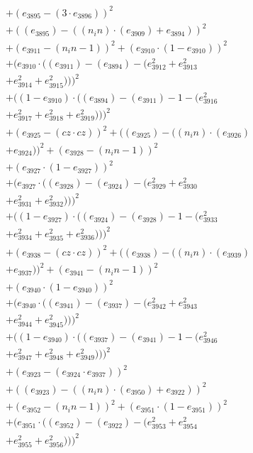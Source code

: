 \documentclass[10pt, a4paper]{article}
\begin{document}
\begin{small}
\begin{align*}
& + (e_{3895} - (3  \cdot  e_{3896}))^{2} \\
& + ((e_{3895}) - ((n_in)  \cdot  (e_{3909}) + e_{3894}))^{2} \\
& + (e_{3911} - (n_in - 1))^{2} + (e_{3910}  \cdot  (1 - e_{3910}))^{2} \\
& + (e_{3910}  \cdot  ((e_{3911}) - (e_{3894}) - (e_{3912}^{2} + e_{3913}^{2} \\
& + e_{3914}^{2} + e_{3915}^{2})))^{2} \\
& + ((1 - e_{3910})  \cdot  ((e_{3894}) - (e_{3911}) - 1 - (e_{3916}^{2} \\
& + e_{3917}^{2} + e_{3918}^{2} + e_{3919}^{2})))^{2} \\
& + (e_{3925} - (cz  \cdot  cz))^{2} + ((e_{3925}) - ((n_in)  \cdot  (e_{3926}) \\
& + e_{3924}))^{2} + (e_{3928} - (n_in - 1))^{2} \\
& + (e_{3927}  \cdot  (1 - e_{3927}))^{2} \\
& + (e_{3927}  \cdot  ((e_{3928}) - (e_{3924}) - (e_{3929}^{2} + e_{3930}^{2} \\
& + e_{3931}^{2} + e_{3932}^{2})))^{2} \\
& + ((1 - e_{3927})  \cdot  ((e_{3924}) - (e_{3928}) - 1 - (e_{3933}^{2} \\
& + e_{3934}^{2} + e_{3935}^{2} + e_{3936}^{2})))^{2} \\
& + (e_{3938} - (cz  \cdot  cz))^{2} + ((e_{3938}) - ((n_in)  \cdot  (e_{3939}) \\
& + e_{3937}))^{2} + (e_{3941} - (n_in - 1))^{2} \\
& + (e_{3940}  \cdot  (1 - e_{3940}))^{2} \\
& + (e_{3940}  \cdot  ((e_{3941}) - (e_{3937}) - (e_{3942}^{2} + e_{3943}^{2} \\
& + e_{3944}^{2} + e_{3945}^{2})))^{2} \\
& + ((1 - e_{3940})  \cdot  ((e_{3937}) - (e_{3941}) - 1 - (e_{3946}^{2} \\
& + e_{3947}^{2} + e_{3948}^{2} + e_{3949}^{2})))^{2} \\
& + (e_{3923} - (e_{3924}  \cdot  e_{3937}))^{2} \\
& + ((e_{3923}) - ((n_in)  \cdot  (e_{3950}) + e_{3922}))^{2} \\
& + (e_{3952} - (n_in - 1))^{2} + (e_{3951}  \cdot  (1 - e_{3951}))^{2} \\
& + (e_{3951}  \cdot  ((e_{3952}) - (e_{3922}) - (e_{3953}^{2} + e_{3954}^{2} \\
& + e_{3955}^{2} + e_{3956}^{2})))^{2} \\

\end{align*}
\end{small}
\end{document}
